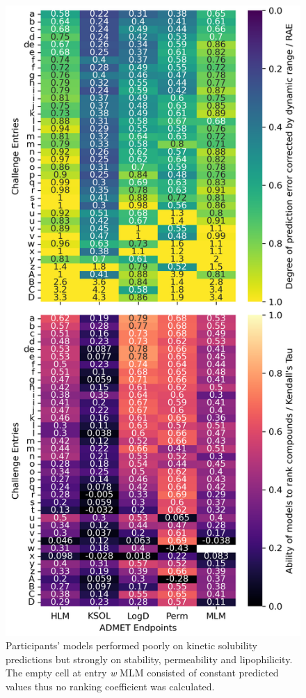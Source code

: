 \documentclass[journal=jacsat,manuscript=article]{achemso}
\begin{document}
\begin{figure}
    \includegraphics[scale=0.6]{04_figs_leaderboards/heatmaps.png}
  \caption{Participants' models performed poorly on kinetic solubility predictions but strongly on stability, permeability and lipophilicity. The empty cell at entry \textit{w} MLM consisted of constant predicted values thus no ranking coefficient was calculated.}
  \label{fgr:heatmaps_admet}
\end{figure}
\end{document}
